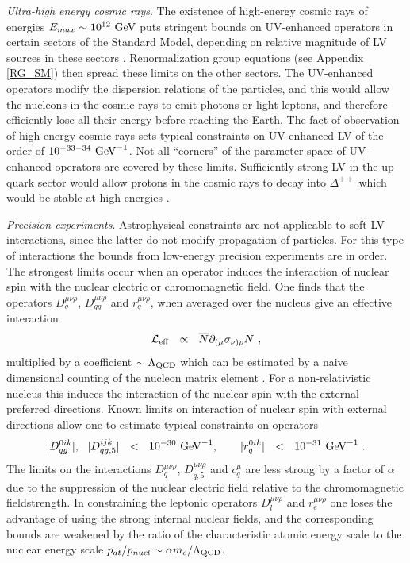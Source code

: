 \documentclass[12pt,preprintnumbers,nofootinbib]{revtex4}
\newcommand{\ov}{\overline}
\newcommand{\GeV}{{\rm GeV}}
\newcommand{\Leff}{{\mathcal{L}_{\rm eff}}}
\newcommand{\LQCD}{{\Lambda_{\rm QCD}}}
\begin{document}
	{\it Ultra-high energy cosmic rays}. 
	The existence of high-energy cosmic rays of energies $ E_{max} \sim 10^{12}~\GeV $ puts
	stringent bounds on UV-enhanced operators in certain sectors of the Standard Model, 
	depending on relative magnitude of LV sources in these sectors
	\cite{Gagnon:2004xh}. 
	Renormalization group equations (see Appendix \ref{RG_SM}) then spread these limits on the 
	other sectors.
	The UV-enhanced operators modify the dispersion relations of the particles, and this would 
	allow the nucleons in the cosmic rays to emit photons or light leptons, and therefore
	efficiently  lose all their energy before reaching the Earth. 
	The fact of observation of high-energy cosmic rays sets typical constraints on UV-enhanced
	LV of the order of $ 10^{-33-34}~\GeV^{-1} $. 
	Not all ``corners'' of the parameter space of UV-enhanced operators are covered by these
	limits.
	Sufficiently strong LV in the up quark sector would allow protons in the cosmic
	rays to decay into $ \Delta^{++} $ which would be stable at high energies
	\cite{Gagnon:2004xh}.
	
	{\it Precision experiments}. 
	Astrophysical constraints are not applicable to soft LV interactions, since the latter do not
	modify propagation of particles.
	For this type of interactions the bounds from low-energy precision experiments are in order.
	The strongest limits occur when an operator induces the interaction 
	of nuclear spin with the nuclear electric 
	or chromomagnetic field. 
	One finds that the operators $ D_q^{\mu\nu\rho} $, $ D_{qg}^{\mu\nu\rho} $ 
	and $ r_q^{\mu\nu\rho} $, 
	when averaged over the nucleus give an effective interaction
\[
	\Leff ~~\propto~~ \ov{N} \partial_{(\mu} \sigma_{\nu)\rho} N ~,
\]
	multiplied by a coefficient $ \sim \LQCD $ which can be estimated by a naive dimensional
	counting of the nucleon matrix element
\cite{Manohar:1983md}.
	For a non-relativistic nucleus this induces the interaction of the nuclear spin with
	the external preferred directions.
	Known limits
\cite{Berglund:}
	on interaction of nuclear spin with external directions allow one to estimate typical
	constraints on operators
\[
	| D_{qg}^{0ik} |, ~~| D_{qg,5}^{ijk} |  ~~<~~ 10^{-30}~\GeV^{-1},
	\qquad
	| r_q^{0ik} | ~~<~~ 10^{-31}~\GeV^{-1}~.
\]
	The limits on the interactions $ D_q^{\mu\nu\rho} $, $ D_{q,5}^{\mu\nu\rho} $ and
	$ c_q^\mu $ are less strong by a factor of $ \alpha $ due to the suppression of the
	nuclear electric field relative to the chromomagnetic fieldstrength.
	In constraining the leptonic operators $ D_l^{\mu\nu\rho} $ and $ r_e^{\mu\nu\rho} $ one
	loses the advantage of using the strong internal nuclear fields, 
	and the corresponding bounds are weakened by the ratio of the characteristic atomic 
	energy scale to the nuclear energy scale $ p_{at}/p_{nucl} \sim \alpha m_e / \LQCD $.
\end{document}
